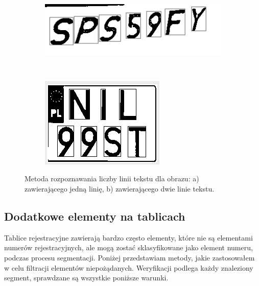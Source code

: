 \begin{figure}
  \centering
  \begin{subfigure}[b]{0.45\textwidth}
    \includegraphics[width=\textwidth]{img/apriori-liczba-linii-jeden}
    \label{fig:apriori_liczba_linii_jeden}
    \caption{}
  \end{subfigure}
  ~
  \begin{subfigure}[b]{0.45\textwidth}
    \includegraphics[width=\textwidth]{img/apriori-liczba-linii-dwa}
    \label{fig:apriori_liczba_linii_dwa}
    \caption{}
  \end{subfigure}
  \caption{Metoda rozpoznawania liczby linii tekstu dla obrazu: a) zawierającego jedną linię, b) zawierającego dwie linie tekstu.}
  \label{fig:apriori_liczba_linii}
\end{figure}

\subsection{Dodatkowe elementy na tablicach}\label{ssec:additional_elements}
Tablice rejestracyjne zawierają bardzo często elementy, które nie są elementami numerów rejestracyjnych, ale mogą zostać sklasyfikowane jako element numeru, podczas procesu segmentacji. Poniżej przedstawiam metody, jakie zastosowałem w celu filtracji elementów niepożądanych. Weryfikacji podlega każdy znaleziony segment, sprawdzane są wszystkie poniższe warunki.
